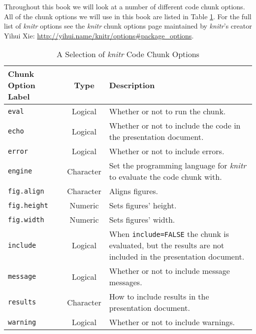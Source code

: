 \begin{knitrout}
\color{fgcolor}\begin{kframe}
\begin{alltt}
%% begin.rcode ChunkLabel, eval=FALSE
% \hlcomment{# Example of a non-evaluated code chunk}
% StringNumObject <- \hlfunctioncall{cbind}(CharacterVect, NumericVect)
%%
\end{alltt}
\end{kframe}
\end{knitrout}


Throughout this book we will look at a number of different code chunk options. All of the chunk options we will use in this book are listed in Table \ref{ChunkOptionsTable}. For the full list of {\emph{knitr}} options see the {\emph{knitr}} chunk options page maintained by {\emph{knitr}}'s creator Yihui Xie: \url{http://yihui.name/knitr/options#package_options}. 


\begin{table}
  \caption{A Selection of {\emph{knitr}} Code Chunk Options}
  \begin{center}
  \label{ChunkOptionsTable}
  \begin{tabular}{l c p{5cm}}
    \hline  
    Chunk Option Label & Type & Description \\[0.25cm] \hline\hline
    \texttt{eval} & Logical & Whether or not to run the chunk. \\[0.25cm]
    \texttt{echo} & Logical & Whether or not to include the code in the presentation document. \\[0.25cm]
    \texttt{error} & Logical & Whether or not to include errors. \\[0.25cm]
    \texttt{engine} & Character & Set the programming language for {\emph{knitr}} to evaluate the code chunk with. \\[0.25cm]
    \texttt{fig.align} & Character & Aligns figures. \\[0.25cm]
    \texttt{fig.height} & Numeric & Sets figures' height. \\[0.25cm]
    \texttt{fig.width} & Numeric & Sets figures' width. \\[0.25cm]
    \texttt{include} & Logical & When \texttt{include=FALSE} the chunk is evaluated, but the results are not included in the presentation document. \\[0.25cm]
    \texttt{message} & Logical & Whether or not to include message messages. \\[0.25cm]
    \texttt{results} & Character & How to include results in the presentation document. \\[0.25cm]
    \texttt{warning} & Logical & Whether or not to include warnings. \\[0.25cm]
    \hline
  \end{tabular}
  \end{center}
\end{table}

